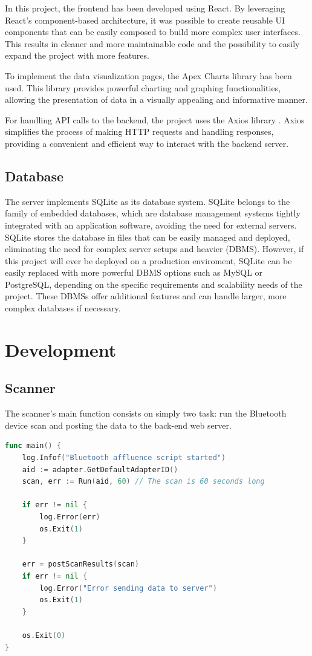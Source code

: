\documentclass[a4paper, 11pt]{article}
\begin{document}
In this project, the frontend has been developed using React. By leveraging React's component-based architecture, it was possible to create reusable UI components that can be easily composed to build more complex user interfaces. This results in cleaner and more maintainable code and the possibility to easily expand the project with more features.

To implement the data visualization pages, the Apex Charts library \cite{apexcharts} has been used. This library provides powerful charting and graphing functionalities, allowing the presentation of data in a visually appealing and informative manner.

For handling API calls to the backend, the project uses the Axios library \cite{axios}. Axios simplifies the process of making HTTP requests and handling responses, providing a convenient and efficient way to interact with the backend server.

\subsection{Database}
The server implements SQLite \cite{sqlite} as its database system. SQLite belongs to the family of embedded databases, which are database management systems tightly integrated with an application software, avoiding the need for external servers. SQLite stores the database in files that can be easily managed and deployed, eliminating the need for complex server setups and heavier (DBMS). 
However, if this project will ever be deployed on a production enviroment, SQLite can be easily replaced with more powerful DBMS options such as MySQL or PostgreSQL, depending on the specific requirements and scalability needs of the project. These DBMSs offer additional features and can handle larger, more complex databases if necessary.

\section{Development}
\subsection{Scanner}
The scanner's main function consists on simply two task: run the Bluetooth device scan and posting the data to the back-end web server.

\begin{lstlisting}[language=Go]
func main() {
	log.Infof("Bluetooth affluence script started")
	aid := adapter.GetDefaultAdapterID()
	scan, err := Run(aid, 60) // The scan is 60 seconds long
	
	if err != nil {
		log.Error(err)
		os.Exit(1)
	}

	err = postScanResults(scan)
	if err != nil {
		log.Error("Error sending data to server")
		os.Exit(1)
	}

	os.Exit(0)
}

\end{lstlisting}
\end{document}

